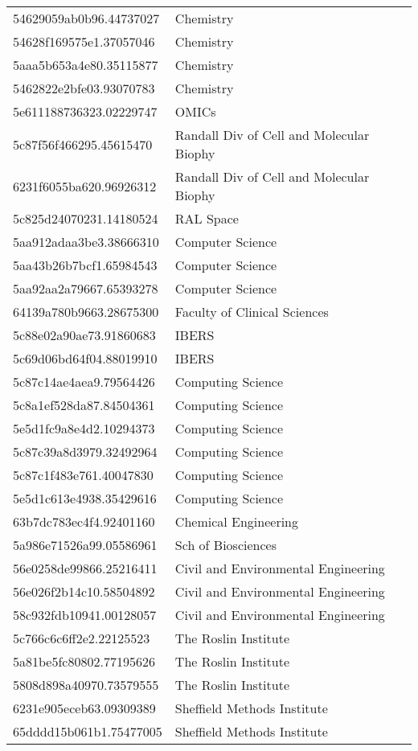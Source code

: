 \begin{tabular}{ll}
54629059ab0b96.44737027 & Chemistry \\
54628f169575e1.37057046 & Chemistry \\
5aaa5b653a4e80.35115877 & Chemistry \\
5462822e2bfe03.93070783 & Chemistry \\
5e611188736323.02229747 & OMICs \\
5c87f56f466295.45615470 & Randall Div of Cell and Molecular Biophy \\
6231f6055ba620.96926312 & Randall Div of Cell and Molecular Biophy \\
5c825d24070231.14180524 & RAL Space \\
5aa912adaa3be3.38666310 & Computer Science \\
5aa43b26b7bcf1.65984543 & Computer Science \\
5aa92aa2a79667.65393278 & Computer Science \\
64139a780b9663.28675300 & Faculty of Clinical Sciences \\
5c88e02a90ae73.91860683 & IBERS \\
5c69d06bd64f04.88019910 & IBERS \\
5c87c14ae4aea9.79564426 & Computing Science \\
5c8a1ef528da87.84504361 & Computing Science \\
5e5d1fc9a8e4d2.10294373 & Computing Science \\
5c87c39a8d3979.32492964 & Computing Science \\
5c87c1f483e761.40047830 & Computing Science \\
5e5d1c613e4938.35429616 & Computing Science \\
63b7dc783ec4f4.92401160 & Chemical Engineering \\
5a986e71526a99.05586961 & Sch of Biosciences \\
56e0258de99866.25216411 & Civil and Environmental Engineering \\
56e026f2b14c10.58504892 & Civil and Environmental Engineering \\
58c932fdb10941.00128057 & Civil and Environmental Engineering \\
5c766c6c6ff2e2.22125523 & The Roslin Institute \\
5a81be5fc80802.77195626 & The Roslin Institute \\
5808d898a40970.73579555 & The Roslin Institute \\
6231e905eceb63.09309389 & Sheffield Methods Institute \\
65dddd15b061b1.75477005 & Sheffield Methods Institute \\

\end{tabular}
